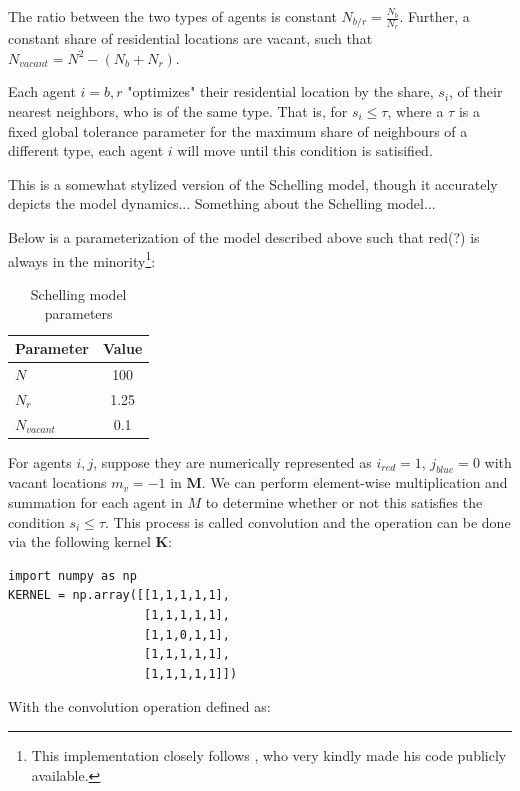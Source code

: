 \documentclass[../main.tex]{subfiles}
\begin{document}
The ratio between the two types of agents is constant $N_{b/r} = \frac{N_b}{N_r}$. Further, a constant share of residential locations are vacant, such that $N_{vacant} = N^2 - (N_b + N_r)$. 

Each agent $i = b, r$ "optimizes" their residential location by the share, $s_i$, of their nearest neighbors, who is of the same type. That is, for $s_i \leq \tau$, where a $\tau$ is a fixed global tolerance parameter for the maximum share of neighbours of a different type, each agent $i$ will move until this condition is satisified. 

This is a somewhat stylized version of the Schelling model, though it accurately depicts the model dynamics... Something about the Schelling model... 

Below is a parameterization of the model described above such that red(?) is always in the minority\footnote{This implementation closely follows \textcite{luca_mingarelli}, who very kindly made his code publicly available.}:

\begin{table}[H]
    \centering
    \caption{Schelling model parameters}
    \begin{tabular}{lc}
    \toprule
      Parameter & Value \\
    \midrule
      $N$         & 100 \\
      $N_r$       & 1.25 \\
      $N_{vacant}$ & 0.1 \\
    \bottomrule
    \end{tabular}
\end{table}

For agents $i, j$, suppose they are numerically represented as $i_{red}=1$, $j_{blue} = 0$ with vacant locations $m_v=-1$ in $\textbf{M}$. We can perform element-wise multiplication and summation for each agent in $M$ to determine whether or not this satisfies the condition $s_i \leq \tau$. This process is called convolution and the operation can be done via the following kernel $\mathbf{K}$:

\begin{lstlisting}[style=pythonstyle]
import numpy as np
KERNEL = np.array([[1,1,1,1,1],
                   [1,1,1,1,1],
                   [1,1,0,1,1],
                   [1,1,1,1,1],
                   [1,1,1,1,1]])

\end{lstlisting}

With the convolution operation defined as:
\end{document}
